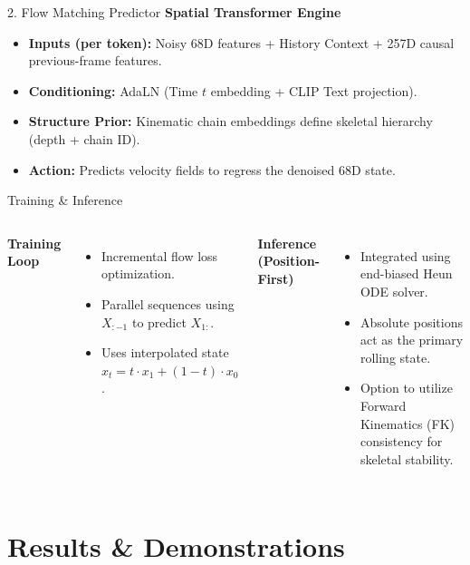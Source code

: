 \documentclass[aspectratio=169]{beamer}
\begin{document}
\begin{frame}{2. Flow Matching Predictor}
    \textbf{Spatial Transformer Engine}
    \begin{itemize}
        \item \textbf{Inputs (per token):} Noisy 68D features + History Context + 257D causal previous-frame features.
        \item \textbf{Conditioning:} AdaLN (Time $t$ embedding + CLIP Text projection).
        \item \textbf{Structure Prior:} Kinematic chain embeddings define skeletal hierarchy (depth + chain ID).
        \item \textbf{Action:} Predicts velocity fields to regress the denoised 68D state.
    \end{itemize}
\end{frame}

\begin{frame}{Training \& Inference}
    \begin{columns}
        \textbf{Training Loop}
        \begin{itemize}
            \item Incremental flow loss optimization.
            \item Parallel sequences using $X_{:-1}$ to predict $X_{1:}$.
            \item Uses interpolated state $x_t = t \cdot x_1 + (1-t) \cdot x_0$.
        \end{itemize}
        
        \textbf{Inference (Position-First)}
        \begin{itemize}
            \item Integrated using end-biased Heun ODE solver.
            \item Absolute positions act as the primary rolling state.
            \item Option to utilize Forward Kinematics (FK) consistency for skeletal stability.
        \end{itemize}
    \end{columns}
\end{frame}

\section{Results \& Demonstrations}
\end{document}
